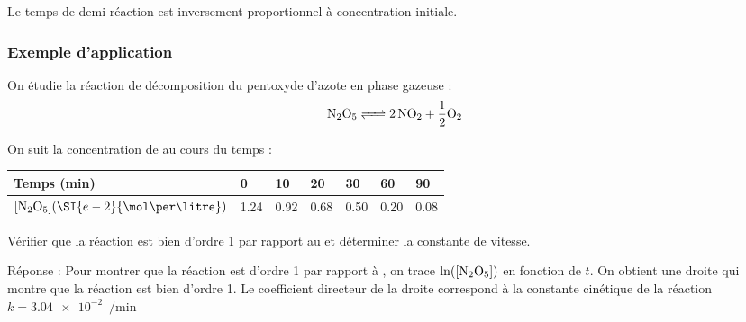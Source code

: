 \documentclass{cours}
\begin{document}
Le temps de demi-réaction est inversement proportionnel à concentration initiale.


\subsubsection{Exemple d'application}%
\label{ssub:exemple_d_application}

On étudie la réaction de décomposition du pentoxyde d'azote en phase gazeuse :
\[
\ce{N2O5 <=> 2NO2 + \frac{1}{2}O2}
\]

On suit la concentration de  au cours du temps :
\begin{center}
  \begin{tabular}{@{}lllllll@{}}
    \toprule  
    Temps (\si{min}) & 0 & 10 & 20 & 30 & 60 & 90 \\
    \midrule
    $[\ce{N2O5}] (\SI{e-2}{\mol\per\litre})$ & \num{1.24} & \num{0.92} & \num{0.68} & \num{0.50} & \num{0.20} & \num{0.08} \\
    \bottomrule
  \end{tabular}
\end{center}
Vérifier que la réaction est bien d'ordre 1 par rapport au  et déterminer la constante de vitesse.

Réponse : Pour montrer que la réaction est d'ordre 1 par rapport à , on trace $\ln([\ce{N2O5}])$ en fonction de $t$. On obtient une droite qui montre que la réaction est bien d'ordre 1. Le coefficient directeur de la droite correspond à la constante cinétique de la réaction $k=\SI{3.04e-2}{\per\min}$ 

\begin{center}
\end{center}
\end{document}
